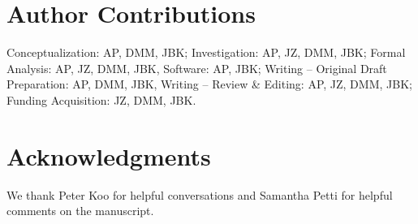 \documentclass[10pt,letterpaper]{article}
\begin{document}
\section*{Author Contributions}

Conceptualization: AP, DMM, JBK; Investigation: AP, JZ, DMM, JBK; Formal Analysis: AP, JZ, DMM, JBK, Software: AP, JBK; Writing -- Original Draft Preparation: AP, DMM, JBK, Writing -- Review \& Editing: AP, JZ, DMM, JBK; Funding Acquisition: JZ, DMM, JBK. 

\section*{Acknowledgments}
We thank Peter Koo for helpful conversations and Samantha Petti for helpful comments on the manuscript. %

\end{document}
